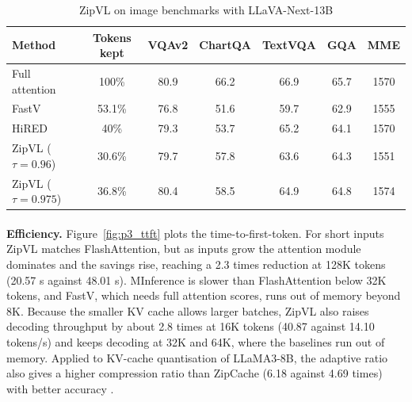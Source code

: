 \documentclass[12pt,a4paper,final]{extreport}
\begin{document}
{\renewcommand{\arraystretch}{1.12}
\begin{table}[htbp]
\centering
\caption{ZipVL on image benchmarks with LLaVA-Next-13B}\label{tab:p3_img}
\small
\begin{tabular}{|l|c|c|c|c|c|c|}
\hline
\textbf{Method} & \textbf{Tokens kept} & \textbf{VQAv2} & \textbf{ChartQA} & \textbf{TextVQA} & \textbf{GQA} & \textbf{MME} \\ \hline
Full attention & 100\% & 80.9 & 66.2 & 66.9 & 65.7 & 1570 \\ \hline
FastV & 53.1\% & 76.8 & 51.6 & 59.7 & 62.9 & 1555 \\ \hline
HiRED & 40\% & 79.3 & 53.7 & 65.2 & 64.1 & 1570 \\ \hline
ZipVL ($\tau=0.96$) & 30.6\% & 79.7 & 57.8 & 63.6 & 64.3 & 1551 \\ \hline
ZipVL ($\tau=0.975$) & 36.8\% & 80.4 & 58.5 & 64.9 & 64.8 & 1574 \\ \hline
\end{tabular}
\end{table}}

\paragraph{} \textbf{Efficiency.} Figure~\ref{fig:p3_ttft} plots the time-to-first-token. For short inputs ZipVL matches FlashAttention, but as inputs grow the attention module dominates and the savings rise, reaching a 2.3 times reduction at 128K tokens (20.57 s against 48.01 s). MInference is slower than FlashAttention below 32K tokens, and FastV, which needs full attention scores, runs out of memory beyond 8K. Because the smaller KV cache allows larger batches, ZipVL also raises decoding throughput by about 2.8 times at 16K tokens (40.87 against 14.10 tokens/s) and keeps decoding at 32K and 64K, where the baselines run out of memory. Applied to KV-cache quantisation of LLaMA3-8B, the adaptive ratio also gives a higher compression ratio than ZipCache (6.18 against 4.69 times) with better accuracy \cite{p3}.
\end{document}
